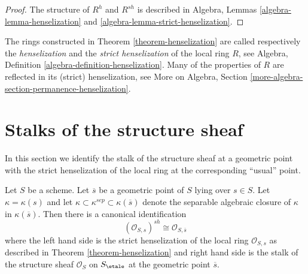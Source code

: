 \begin{proof}
The structure of $R^h$ and $R^{sh}$ is described in
Algebra, Lemmas \ref{algebra-lemma-henselization} and
\ref{algebra-lemma-strict-henselization}.
\end{proof}

\noindent
The rings constructed in Theorem \ref{theorem-henselization}
are called respectively the {\it henselization} and the
{\it strict henselization} of the local ring $R$, see
Algebra, Definition \ref{algebra-definition-henselization}.
Many of the properties of $R$ are reflected in its (strict) henselization,
see More on Algebra,
Section \ref{more-algebra-section-permanence-henselization}.




\section{Stalks of the structure sheaf}
\label{section-stalks-structure-sheaf}

\noindent
In this section we identify the stalk of the structure sheaf at a geometric
point with the strict henselization of the local ring at the corresponding
``usual'' point.

\begin{lemma}
\label{lemma-describe-etale-local-ring}
Let $S$ be a scheme.
Let $\overline{s}$ be a geometric point of $S$ lying over $s \in S$.
Let $\kappa = \kappa(s)$ and let
$\kappa \subset \kappa^{sep} \subset \kappa(\overline{s})$ denote
the separable algebraic closure of $\kappa$ in $\kappa(\overline{s})$.
Then there is a canonical identification
$$
(\mathcal{O}_{S, s})^{sh}
\cong
\mathcal{O}_{S, \overline{s}}
$$
where the left hand side is the strict henselization of the local ring
$\mathcal{O}_{S, s}$ as described in
Theorem \ref{theorem-henselization}
and right hand side is the stalk of the structure sheaf
$\mathcal{O}_S$ on $S_\etale$ at
the geometric point $\overline{s}$.
\end{lemma}

